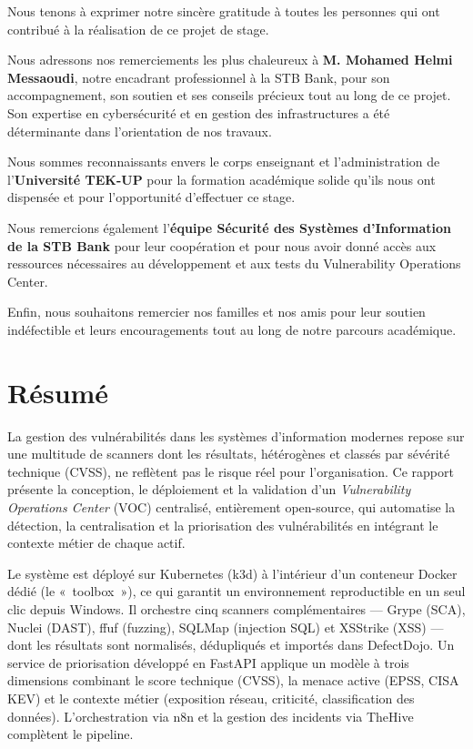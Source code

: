 \documentclass[12pt,a4paper]{report}
\begin{document}
Nous tenons à exprimer notre sincère gratitude à toutes les personnes qui ont contribué à la réalisation de ce projet de stage.

Nous adressons nos remerciements les plus chaleureux à \textbf{M. Mohamed Helmi Messaoudi}, notre encadrant professionnel à la STB Bank, pour son accompagnement, son soutien et ses conseils précieux tout au long de ce projet. Son expertise en cybersécurité et en gestion des infrastructures a été déterminante dans l'orientation de nos travaux.

Nous sommes reconnaissants envers le corps enseignant et l'administration de l'\textbf{Université TEK-UP} pour la formation académique solide qu'ils nous ont dispensée et pour l'opportunité d'effectuer ce stage.

Nous remercions également l'\textbf{équipe Sécurité des Systèmes d'Information de la STB Bank} pour leur coopération et pour nous avoir donné accès aux ressources nécessaires au développement et aux tests du Vulnerability Operations Center.

Enfin, nous souhaitons remercier nos familles et nos amis pour leur soutien indéfectible et leurs encouragements tout au long de notre parcours académique.
\newpage

\thispagestyle{empty}
\section*{Résumé}

La gestion des vulnérabilités dans les systèmes d'information modernes repose sur une multitude de scanners dont les résultats, hétérogènes et classés par sévérité technique (CVSS), ne reflètent pas le risque réel pour l'organisation. Ce rapport présente la conception, le déploiement et la validation d'un \emph{Vulnerability Operations Center} (VOC) centralisé, entièrement open-source, qui automatise la détection, la centralisation et la priorisation des vulnérabilités en intégrant le contexte métier de chaque actif.

Le système est déployé sur Kubernetes (k3d) à l'intérieur d'un conteneur Docker dédié (le «~toolbox~»), ce qui garantit un environnement reproductible en un seul clic depuis Windows. Il orchestre cinq scanners complémentaires --- Grype (SCA), Nuclei (DAST), ffuf (fuzzing), SQLMap (injection SQL) et XSStrike (XSS) --- dont les résultats sont normalisés, dédupliqués et importés dans DefectDojo. Un service de priorisation développé en FastAPI applique un modèle à trois dimensions combinant le score technique (CVSS), la menace active (EPSS, CISA KEV) et le contexte métier (exposition réseau, criticité, classification des données). L'orchestration via n8n et la gestion des incidents via TheHive complètent le pipeline.
\end{document}
